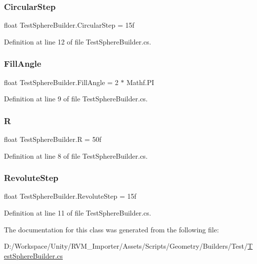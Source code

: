 \subsubsection{\texorpdfstring{CircularStep}{CircularStep}}
{\footnotesize\ttfamily float Test\+Sphere\+Builder.\+Circular\+Step = 15f}



Definition at line 12 of file Test\+Sphere\+Builder.\+cs.

\mbox{\label{class_test_sphere_builder_a2f2519aa35b59088558b1278b39785f6}} 
\subsubsection{\texorpdfstring{FillAngle}{FillAngle}}
{\footnotesize\ttfamily float Test\+Sphere\+Builder.\+Fill\+Angle = 2 $\ast$ Mathf.\+PI}



Definition at line 9 of file Test\+Sphere\+Builder.\+cs.

\mbox{\label{class_test_sphere_builder_a2df230f71771bed5c9536e3dc1b0e400}} 
\subsubsection{\texorpdfstring{R}{R}}
{\footnotesize\ttfamily float Test\+Sphere\+Builder.\+R = 50f}



Definition at line 8 of file Test\+Sphere\+Builder.\+cs.

\mbox{\label{class_test_sphere_builder_acfeb82ac98b24881642783bfc56f5bfa}} 
\subsubsection{\texorpdfstring{RevoluteStep}{RevoluteStep}}
{\footnotesize\ttfamily float Test\+Sphere\+Builder.\+Revolute\+Step = 15f}



Definition at line 11 of file Test\+Sphere\+Builder.\+cs.



The documentation for this class was generated from the following file\+:\begin{DoxyCompactItemize}
\item 
D\+:/\+Workspace/\+Unity/\+R\+V\+M\+\_\+\+Importer/\+Assets/\+Scripts/\+Geometry/\+Builders/\+Test/\mbox{\hyperlink{_test_sphere_builder_8cs}{Test\+Sphere\+Builder.\+cs}}\end{DoxyCompactItemize}
